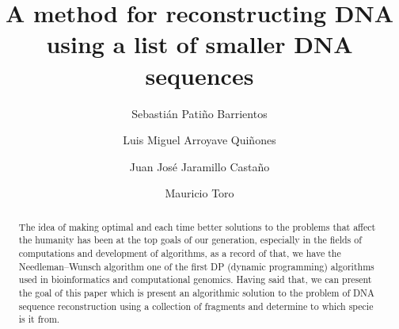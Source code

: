 \documentclass[sigconf]{acmart}
\begin{document}
\title{A method for reconstructing DNA using a list of smaller DNA sequences}

\author{Sebastián Patiño Barrientos}

\author{Luis Miguel Arroyave Quiñones}

\author{Juan José Jaramillo Castaño}

\author{Mauricio Toro}

\renewcommand{\shortauthors}{S. Patiño, Luis M. Arroyave, JJ. Jaramillo, M. Toro}


\begin{abstract}
The idea of making optimal and each time better solutions to the problems that affect the humanity has been at the top goals of our generation, especially in the fields of computations and development of algorithms, as a record of that, we have the Needleman–Wunsch algorithm one of the first DP (dynamic programming) algorithms used in bioinformatics and computational genomics. Having said that, we can present the goal of this paper which is present an algorithmic solution to the problem of DNA sequence reconstruction using a collection of fragments and determine to which specie is it from.
\end{abstract}


\maketitle



\nocite{*}

\balance
 
\end{document}
